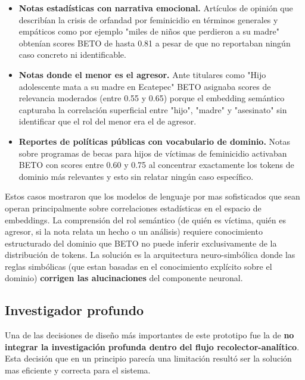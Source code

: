 \begin{itemize}
    \item \textbf{Notas estadísticas con narrativa emocional.} Artículos de opinión
          que describían la crisis de orfandad por feminicidio en términos generales
          y empáticos como por ejemplo "miles de niños que perdieron a su madre"
          obtenían scores BETO de hasta 0.81 a pesar de que no reportaban ningún caso concreto
          ni identificable.

    \item \textbf{Notas donde el menor es el agresor.} Ante titulares como
          "Hijo adolescente mata a su madre en Ecatepec" BETO asignaba
          scores de relevancia moderados (entre 0.55 y 0.65) porque el embedding semántico
          capturaba la correlación superficial entre "hijo", "madre" y "asesinato" sin
          identificar que el rol del menor era el de agresor.

    \item \textbf{Reportes de políticas públicas con vocabulario de dominio.}
          Notas sobre programas de becas para hijos de víctimas de feminicidio
          activaban BETO con scores entre 0.60 y 0.75 al concentrar exactamente los
          tokens de dominio más relevantes y esto sin relatar ningún caso específico.
\end{itemize}

Estos casos mostraron que los modelos de lenguaje por mas sofisticados que sean
operan principalmente sobre correlaciones estadísticas en el espacio de embeddings.
La comprensión del rol semántico (de quién es víctima, quién es agresor,
si la nota relata un hecho o un análisis) requiere conocimiento estructurado del
dominio que BETO no puede inferir exclusivamente de la distribución de tokens.
La solución es la arquitectura neuro-simbólica donde las reglas simbólicas (que estan
basadas en el conocimiento explícito sobre el dominio) \textbf{corrigen
las alucinaciones} del componente neuronal.

\subsection{Investigador profundo}
\label{subsec:tt2_investigador}

Una de las decisiones de diseño más importantes de este prototipo fue la de
\textbf{no integrar la investigación profunda dentro del flujo recolector-analítico}.
Esta decisión que en un principio parecía una limitación resultó
ser la solución mas eficiente y correcta para el sistema.

